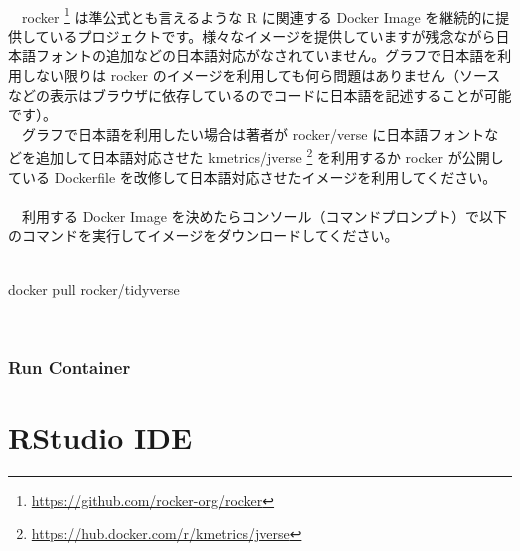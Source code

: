 \documentclass[
  12pt,
]{book}
\newenvironment{Shaded}{\begin{snugshade}}{\end{snugshade}}
\newcommand{\ExtensionTok}[1]{#1}
\newcommand{\NormalTok}[1]{#1}
\DeclareRobustCommand{\href}[2]{#2\footnote{\url{#1}}}
\begin{document}
　\\
　\href{https://github.com/rocker-org/rocker}{rocker } は準公式とも言えるような R に関連する Docker Image を継続的に提供しているプロジェクトです。様々なイメージを提供していますが残念ながら日本語フォントの追加などの日本語対応がなされていません。グラフで日本語を利用しない限りは rocker のイメージを利用しても何ら問題はありません（ソースなどの表示はブラウザに依存しているのでコードに日本語を記述することが可能です）。\\
　グラフで日本語を利用したい場合は著者が rocker/verse に日本語フォントなどを追加して日本語対応させた \href{https://hub.docker.com/r/kmetrics/jverse}{kmetrics/jverse } を利用するか rocker が公開している Dockerfile を改修して日本語対応させたイメージを利用してください。\\
　\\
　利用する Docker Image を決めたらコンソール（コマンドプロンプト）で以下のコマンドを実行してイメージをダウンロードしてください。\\
　

\begin{Shaded}
\begin{Highlighting}[]
\ExtensionTok{docker}\NormalTok{ pull rocker/tidyverse}
\end{Highlighting}
\end{Shaded}

　

\hypertarget{run-container}{%
\subsection{Run Container}\label{run-container}}

\hypertarget{rstudio-ide}{%
\chapter{RStudio IDE}\label{rstudio-ide}}
\end{document}
